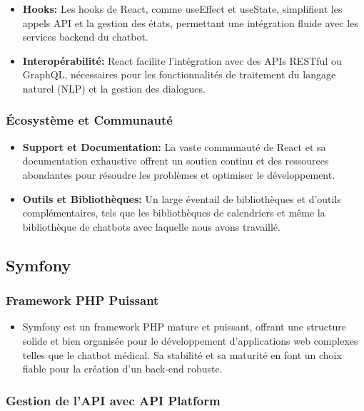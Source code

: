 \begin{itemize}
  \item \textbf{Hooks: }Les hooks de React, comme useEffect et useState, simplifient les appels API et la gestion des états, permettant une intégration fluide avec les services backend du chatbot.
  \item \textbf{Interopérabilité: }React facilite l'intégration avec des APIs RESTful ou GraphQL, nécessaires pour les fonctionnalités de traitement du langage naturel (NLP) et la gestion des dialogues.
\end{itemize}

\subsubsection{Écosystème et Communauté}

\begin{itemize}
  \item \textbf{Support et Documentation: }La vaste communauté de React et sa documentation exhaustive offrent un soutien continu et des ressources abondantes pour résoudre les problèmes et optimiser le développement.
  \item \textbf{Outils et Bibliothèques: }Un large éventail de bibliothèques et d'outils complémentaires, tels que les bibliothèques de calendriers et même la bibliothèque de chatbots avec laquelle nous avons travaillé.
\end{itemize}


\subsection{Symfony}


\subsubsection{Framework PHP Puissant}

\begin{itemize}
  \item Symfony est un framework PHP mature et puissant, offrant une structure solide et bien organisée pour le développement d'applications web complexes telles que le chatbot médical. Sa stabilité et sa maturité en font un choix fiable pour la création d'un back-end robuste.
\end{itemize}

\subsubsection{Gestion de l'API avec API Platform}

